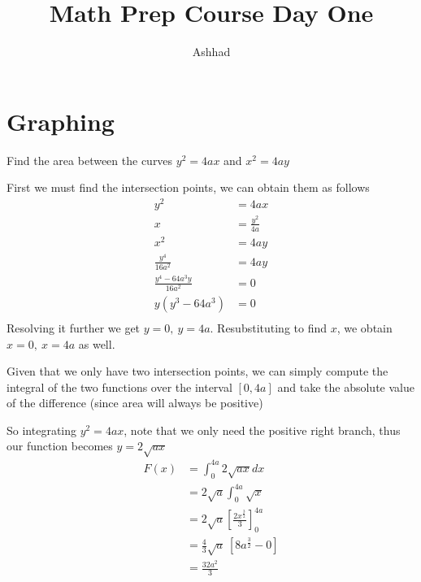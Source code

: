 \documentclass[a4paper]{article}
\title{Math Prep Course Day One}
\author{Ashhad}
\begin{document}
\maketitle

\section{Graphing}

\begin{question}
	Find the area between the curves \(y^2=4ax\) and \(x^2 = 4ay\)
\end{question}

\begin{center}
\end{center}


First we must find the intersection points, we can obtain them as follows
\begin{align*}
	y^2 &= 4ax \\
	x &= \frac{y^2}{4a} \\
	x^2 &= 4ay \\
	\frac{y^4}{16a^2} &= 4ay \\
	\frac{y^4 - 64a^3y}{16a^2} &= 0 \\
	y(y^3 - 64a^3) &= 0 \\
\end{align*}
Resolving it further we get \(y=0,\ y=4a\). Resubstituting to find \(x\), we obtain \(x=0,\ x=4a\) as well.

Given that we only have two intersection points, we can simply compute the integral of the two functions over the interval \([0, 4a]\) and take the absolute value of the difference (since area will always be positive)

So integrating \(y^2 = 4ax\), note that we only need the positive right branch, thus our function becomes \(y = 2\sqrt{ax}\)
\begin{align*}
	F(x) &= \int_{0}^{4a} 2\sqrt{ax}dx \\
		&= 2\sqrt{a} \int_{0}^{4a} \sqrt{x} \\
		&= 2\sqrt{a} \left[\frac{2x^{\frac{3}{2}}}{3}\right]^{4a} _{0} \\
		&= \frac{4}{3}\sqrt{a} \ [8a^{\frac{3}{2}} - 0] \\
		&= \frac{32a^2}{3}
\end{align*}
\end{document}
